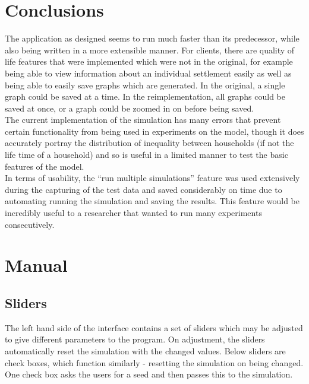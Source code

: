 \documentclass[12pt]{article}
\begin{document}
			
			
	\section{Conclusions}
		The application as designed seems to run much faster than its predecessor, while also being written in a more extensible manner. For clients, there are quality of life features that were implemented which were not in the original, for example being able to view information about an individual settlement easily as well as being able to easily save graphs which are generated. In the original, a single graph could be saved at a time. In the reimplementation, all graphs could be saved at once, or a graph could be zoomed in on before being saved.\\
		The current implementation of the simulation has many errors that prevent certain functionality from being used in experiments on the model, though it does accurately portray the distribution of inequality between households (if not the life time of a household) and so is useful in a limited manner to test the basic features of the model.\\
		In terms of usability, the “run multiple simulations” feature was used extensively during the capturing of the test data and saved considerably on time due to automating running the simulation and saving the results. This feature would be incredibly useful to a researcher that wanted to run many experiments consecutively.\\
		
	\begin{thebibliography}{9}
		
	\end{thebibliography}

	\appendix
	\section{Manual}
		\subsection{Sliders}
			The left hand side of the interface contains a set of sliders which may be adjusted to give different parameters to the program. On adjustment, the sliders automatically reset the simulation with the changed values. Below sliders are check boxes, which function similarly - resetting the simulation on being changed. One check box asks the users for a seed and then passes this to the simulation.
		
\end{document}
